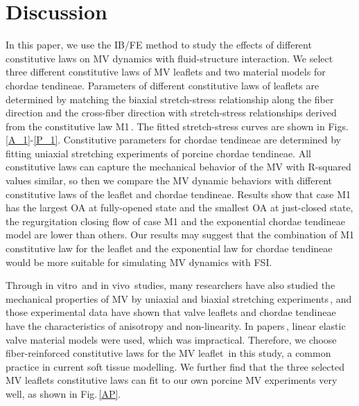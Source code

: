 \documentclass[fleqn,10pt]{wlscirep}
\begin{document}
\section*{Discussion}

In this paper, we use the IB/FE method to study the effects of different constitutive laws on MV dynamics with fluid-structure interaction. We select three different constitutive laws of MV leaflets and two material models for chordae tendineae. Parameters of different constitutive laws of leaflets are determined by matching the biaxial stretch-stress relationship along the fiber direction and the cross-fiber direction with  stretch-stress relationships derived from the constitutive law M1\,\cite{Hao2014A}. The fitted stretch-stress curves are shown in Figs.\,\ref{A_1}-\ref{P_1}. Constitutive parameters for  chordae tendineae are determined by fitting uniaxial stretching experiments of porcine chordae tendineae. All constitutive laws can capture the mechanical behavior of the MV with R-squared values similar, so then we compare the MV dynamic behaviors with different constitutive laws of the leaflet and  chordae tendineae. Results show that case M1 has the largest OA at fully-opened state and the smallest OA at just-closed state, the regurgitation closing flow of case M1 and the exponential chordae tendineae model are lower than others. Our results may suggest that the combination of  M1 constitutive law for the leaflet and the exponential law for  chordae tendineae would be more suitable for simulating MV dynamics with FSI.


Through in vitro\,\cite{Sacks2003Incorporation,He2003Mitral,May1995Biaxial} and in vivo\,\cite{Sacks2006In} studies, many researchers have also studied the mechanical properties of MV by uniaxial and biaxial stretching experiments\,\cite{Prot2010On,Zuo2016Characterization}, and those experimental data have shown that valve leaflets and chordae tendineae have the characteristics of anisotropy and non-linearity. In papers\,\cite{Chung2014An,Votta2006Finite,Votta2007The,Loon2007Comparison}, linear elastic valve material models were used, which was impractical. Therefore, we choose fiber-reinforced constitutive laws for the MV leaflet\,\cite{Prot2009Nonlinear,Prot2010On} in this study, a common practice in current soft tissue modelling. We further find that the three selected MV leaflets constitutive laws can fit to our own porcine MV experiments very well, as shown in Fig.\,\ref{AP}.
\end{document}
